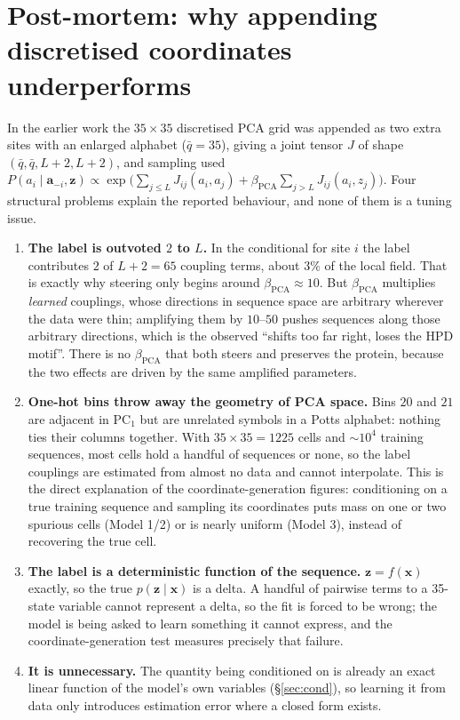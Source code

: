 \documentclass[10pt,a4paper]{article}
\newcommand{\PC}{\mathrm{PC}}
\newcommand{\PCA}{\mathrm{PCA}}
\begin{document}
\section{Post-mortem: why appending discretised coordinates underperforms}\label{sec:post}
In the earlier work the $35\times35$ discretised PCA grid was appended as two extra sites with an
enlarged alphabet ($\bar q=35$), giving a joint tensor $J$ of shape
$(\bar q,\bar q,L{+}2,L{+}2)$, and sampling used
$P(a_i\mid\bm a_{-i},\bm z)\propto\exp\big(\sum_{j\le L}J_{ij}(a_i,a_j)+\beta_{\PCA}\sum_{j>L}
J_{ij}(a_i,z_j)\big)$.
Four structural problems explain the reported behaviour, and none of them is a tuning issue.

\begin{enumerate}[leftmargin=*,itemsep=3pt]
\item \textbf{The label is outvoted $2$ to $L$.} In the conditional for site $i$ the label
      contributes $2$ of $L+2=65$ coupling terms, about $3\%$ of the local field. That is exactly
      why steering only begins around $\beta_{\PCA}\approx10$. But $\beta_{\PCA}$ multiplies
      \emph{learned} couplings, whose directions in sequence space are arbitrary wherever the data
      were thin; amplifying them by $10$--$50$ pushes sequences along those arbitrary directions,
      which is the observed ``shifts too far right, loses the HPD motif''. There is no
      $\beta_{\PCA}$ that both steers and preserves the protein, because the two effects are
      driven by the same amplified parameters.
\item \textbf{One-hot bins throw away the geometry of PCA space.} Bins $20$ and $21$ are adjacent
      in $\PC_1$ but are unrelated symbols in a Potts alphabet: nothing ties their columns
      together. With $35\times35=1225$ cells and ${\sim}10^4$ training sequences, most cells hold a
      handful of sequences or none, so the label couplings are estimated from almost no data and
      cannot interpolate. This is the direct explanation of the coordinate-generation figures:
      conditioning on a true training sequence and sampling its coordinates puts mass on one or
      two spurious cells (Model 1/2) or is nearly uniform (Model 3), instead of recovering the
      true cell.
\item \textbf{The label is a deterministic function of the sequence.} $\bm z=f(\bm x)$ exactly, so
      the true $p(\bm z\mid\bm x)$ is a delta. A handful of pairwise terms to a 35-state variable
      cannot represent a delta, so the fit is forced to be wrong; the model is being asked to
      learn something it cannot express, and the coordinate-generation test measures precisely
      that failure.
\item \textbf{It is unnecessary.} The quantity being conditioned on is already an exact linear
      function of the model's own variables (\S\ref{sec:cond}), so learning it from data only
      introduces estimation error where a closed form exists.
\end{enumerate}
\end{document}
